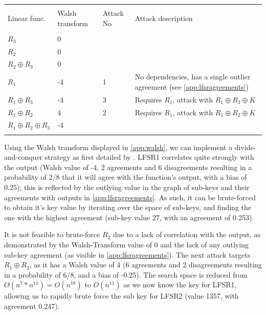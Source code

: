 \documentclass[british,10pt,a4paper]{article}
\begin{document}
\begin{center}
	\begin{tabular}{lllp{6.5cm}}\label{tab:streamattack} \\
		\toprule \\
		Linear func.  & Walsh transform & Attack No & Attack description \\
		\midrule \\
		\(R_3\) & 0 \\
		\(R_2\) & 0 & & \\
		\(R_2 \oplus R_3\) & 0 & & \\
		\(R_1\) & -4 & 1 & No dependencies, has a single outlier agreement (see \autoref{app:lfsragreements}) \\
		\(R_1 \oplus R_3\) & -4 & 3 & Requires \(R_1\), attack with \(R_1 \oplus R_3 \oplus K\) \\
		\(R_1 \oplus R_2\) & 4 & 2 & Requires \(R_1\), attack with \(R_1 \oplus R_2 \oplus K\)\\
		\(R_1 \oplus R_2 \oplus R_3\) & -4 & & \\

		\bottomrule \\
	\end{tabular}
\end{center}
Using the Walsh transform displayed in \autoref{app:walsh}, we can implement a divide-and-conquer strategy as first detailed by \citet{siegenthaler}.
LFSR1 correlates quite strongly with the output (Walsh value of -4, 2 agreements and 6 disagreements resulting in a probability of 2/8 that it will agree with the function's output, with a bias of 0.25); this is reflected by the outlying value in the graph of sub-keys and their agreements with outputs in \autoref{app:lfsragreements}. As such, it can be brute-forced to obtain it's key value by iterating over the space of sub-keys, and finding the one with the highest agreement (sub-key value 27, with an agreement of 0.253).

It is not feasible to brute-force \(R_2\) due to a lack of correlation with the output, as demonstrated by the Walsh-Transform value of 0 and the lack of any outlying sub-key agreement (as visible in \autoref{app:lfsragreements}). The next attack targets \(R_1 \oplus R_2\), as it has a Walsh value of 4 (6 agreements and 2 disagreements resulting in a probability of 6/8, and a bias of -0.25). 
The search space is reduced from \(O(n^{7} * n^{11})=O(n^{18})\) to \(O(n^{11})\) as we now know the key for LFSR1, allowing us to rapidly brute force the sub key for LFSR2 (value 1357, with agreement 0.247).
\end{document}
